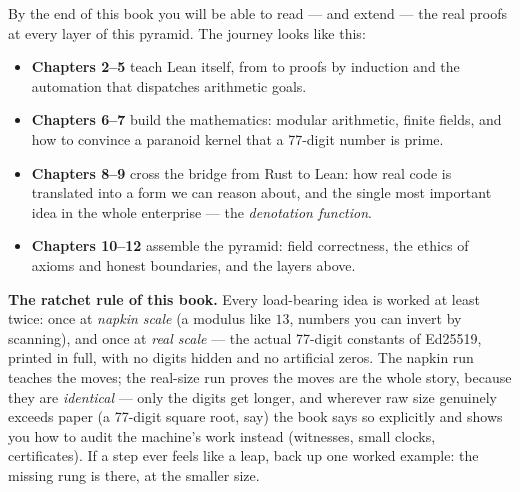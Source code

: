 \begin{center}
\end{center}

By the end of this book you will be able to read --- and extend --- the real
proofs at every layer of this pyramid. The journey looks like this:

\begin{itemize}[leftmargin=1.4em]
\item \textbf{Chapters 2--5} teach Lean itself, from  to
  proofs by induction and the automation that dispatches arithmetic goals.
\item \textbf{Chapters 6--7} build the mathematics: modular arithmetic, finite
  fields, and how to convince a paranoid kernel that a 77-digit number is
  prime.
\item \textbf{Chapters 8--9} cross the bridge from Rust to Lean: how real
  code is translated into a form we can reason about, and the single most
  important idea in the whole enterprise --- the \emph{denotation function}.
\item \textbf{Chapters 10--12} assemble the pyramid: field correctness, the
  ethics of axioms and honest boundaries, and the layers above.
\end{itemize}

\begin{bigidea}
\textbf{The ratchet rule of this book.} Every load-bearing idea is worked
at least twice: once at \emph{napkin scale} (a modulus like $13$, numbers
you can invert by scanning), and once at \emph{real scale} --- the actual
77-digit constants of Ed25519, printed in full, with no digits hidden and
no artificial zeros. The napkin run teaches the moves; the real-size run
proves the moves are the whole story, because they are \emph{identical} ---
only the digits get longer, and wherever raw size genuinely exceeds paper
(a 77-digit square root, say) the book says so explicitly and shows you
how to audit the machine's work instead (witnesses, small clocks,
certificates). If a step ever feels like a leap, back up one worked
example: the missing rung is there, at the smaller size.
\end{bigidea}

